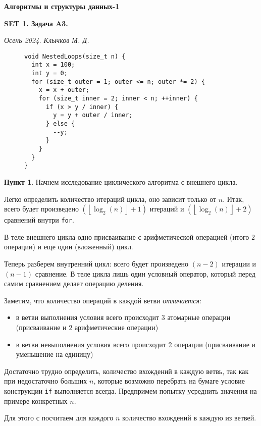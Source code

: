 \documentclass[11pt,a4paper]{scrarticle}
\author{Клычков Максим Дмитриевич}
\theoremstyle{definition}
\newtheorem{subtask}{Пункт}
\begin{document}
\centerline{\textbf{\huge Алгоритмы и структуры данных-1}}
\centerline{\textbf{SET 1. Задача A3.}}
\begin{flushright}
	\emph{Осень 2024. Клычков М. Д.}
\end{flushright}

\begin{figure}[htp]
	\centering
	\begin{verbatim}
void NestedLoops(size_t n) {
  int x = 100;
  int y = 0;
  for (size_t outer = 1; outer <= n; outer *= 2) {
    x = x + outer;
    for (size_t inner = 2; inner < n; ++inner) {
      if (x > y / inner) {
        y = y + outer / inner;
      } else {
        --y;
      }
    }
  }
}
	\end{verbatim}
\end{figure}

\begin{subtask}
	Начнем исследование циклического алгоритма с внешнего цикла.

	Легко определить количество итераций цикла, оно зависит только от $n$. Итак, всего будет произведено $(\left\lfloor \log_2(n) \right\rfloor + 1)$ итераций и $(\left\lfloor \log_2(n) \right\rfloor + 2)$ сравнений внутри \texttt{for}.

	В теле внешнего цикла одно присваивание с арифметической операцией (итого $2$ операции) и еще один (вложенный) цикл.

	Теперь разберем внутренний цикл: всего будет произведено $(n - 2)$ итерации и $(n - 1)$ сравнение. В теле цикла лишь один условный оператор, который перед самим сравнением делает операцию деления.

	Заметим, что количество операций в каждой ветви \emph{отличается}:
	\begin{itemize}
		\item в ветви выполнения условия всего происходит $3$ атомарные операции (присваивание и $2$ арифметические операции)
		\item в ветви невыполнения условия всего происходит 2 операции (присваивание и уменьшение на единицу)
	\end{itemize}

	Достаточно трудно определить, количество вхождений в каждую ветвь, так как при недостаточно больших $n$, которые возможно перебрать на бумаге условие конструкции \texttt{if} выполняется всегда. Предпримем попытку усреднить значения на примере конкретных $n$.

	Для этого с посчитаем для каждого $n$ количество вхождений в каждую из ветвей.


\end{subtask}
\end{document}
